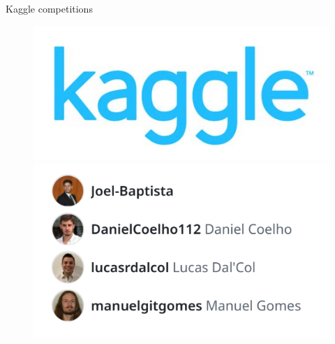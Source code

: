 \begin{frame}{Kaggle competitions}
    \begin{figure}
        \begin{minipage}[t]{0.30\linewidth}
            \centering
            \vspace{0pt}
            \includegraphics[width=\textwidth]{img/kaggle.jpeg}
        \end{minipage}
        \hspace{0.5cm}
        \begin{minipage}[t]{0.50\linewidth}
            \centering
            \vspace{0pt}
            \includegraphics[width=\textwidth]{img/dr-monkeys.png}
        \end{minipage}
    \end{figure}
\end{frame}
